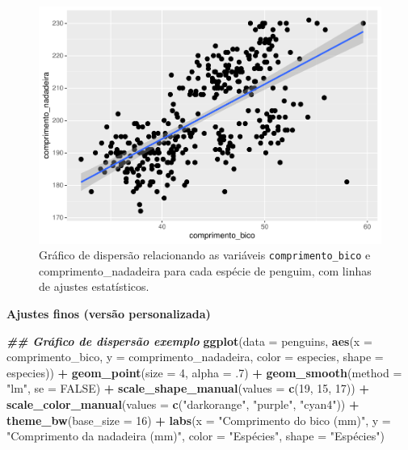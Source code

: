 \documentclass[
]{article}
\newenvironment{Shaded}{\begin{snugshade}}{\end{snugshade}}
\newcommand{\AttributeTok}[1]{\textcolor[rgb]{0.13,0.29,0.53}{#1}}
\newcommand{\ConstantTok}[1]{\textcolor[rgb]{0.56,0.35,0.01}{#1}}
\newcommand{\DecValTok}[1]{\textcolor[rgb]{0.00,0.00,0.81}{#1}}
\newcommand{\DocumentationTok}[1]{\textcolor[rgb]{0.56,0.35,0.01}{\textbf{\textit{#1}}}}
\newcommand{\FunctionTok}[1]{\textcolor[rgb]{0.13,0.29,0.53}{\textbf{#1}}}
\newcommand{\NormalTok}[1]{#1}
\newcommand{\SpecialCharTok}[1]{\textcolor[rgb]{0.81,0.36,0.00}{\textbf{#1}}}
\newcommand{\StringTok}[1]{\textcolor[rgb]{0.31,0.60,0.02}{#1}}
\begin{document}
\begin{figure}
\centering
\includegraphics{epr_files/figure-latex/fig-scatter-smooth-1.pdf}
\caption{\label{fig:fig-scatter-smooth}Gráfico de dispersão relacionando as variáveis \texttt{comprimento\_bico} e comprimento\_nadadeira para cada espécie de penguim, com linhas de ajustes estatísticos.}
\end{figure}

\textbf{Ajustes finos (versão personalizada)}

\begin{Shaded}
\begin{Highlighting}[]
\DocumentationTok{\#\# Gráfico de dispersão exemplo}
\FunctionTok{ggplot}\NormalTok{(}\AttributeTok{data =}\NormalTok{ penguins, }\FunctionTok{aes}\NormalTok{(}\AttributeTok{x =}\NormalTok{ comprimento\_bico, }\AttributeTok{y =}\NormalTok{ comprimento\_nadadeira,}
                            \AttributeTok{color =}\NormalTok{ especies, }\AttributeTok{shape =}\NormalTok{ especies)) }\SpecialCharTok{+}
    \FunctionTok{geom\_point}\NormalTok{(}\AttributeTok{size =} \DecValTok{4}\NormalTok{, }\AttributeTok{alpha =}\NormalTok{ .}\DecValTok{7}\NormalTok{) }\SpecialCharTok{+}
    \FunctionTok{geom\_smooth}\NormalTok{(}\AttributeTok{method =} \StringTok{"lm"}\NormalTok{, }\AttributeTok{se =} \ConstantTok{FALSE}\NormalTok{) }\SpecialCharTok{+}
    \FunctionTok{scale\_shape\_manual}\NormalTok{(}\AttributeTok{values =} \FunctionTok{c}\NormalTok{(}\DecValTok{19}\NormalTok{, }\DecValTok{15}\NormalTok{, }\DecValTok{17}\NormalTok{)) }\SpecialCharTok{+}
    \FunctionTok{scale\_color\_manual}\NormalTok{(}\AttributeTok{values =} \FunctionTok{c}\NormalTok{(}\StringTok{"darkorange"}\NormalTok{, }\StringTok{"purple"}\NormalTok{, }\StringTok{"cyan4"}\NormalTok{)) }\SpecialCharTok{+}
    \FunctionTok{theme\_bw}\NormalTok{(}\AttributeTok{base\_size =} \DecValTok{16}\NormalTok{) }\SpecialCharTok{+}
    \FunctionTok{labs}\NormalTok{(}\AttributeTok{x =} \StringTok{"Comprimento do bico (mm)"}\NormalTok{, }\AttributeTok{y =} \StringTok{"Comprimento da nadadeira (mm)"}\NormalTok{, }
         \AttributeTok{color =} \StringTok{"Espécies"}\NormalTok{, }\AttributeTok{shape =} \StringTok{"Espécies"}\NormalTok{)}
\end{Highlighting}
\end{Shaded}
\end{document}
